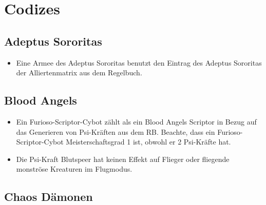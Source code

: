 \section{Codizes}

\subsection{Adeptus Sororitas}

\begin{itemize}

 \item Eine Armee des Adeptus Sororitas benutzt den Eintrag des Adeptus
  Sororitas der Alliertenmatrix aus dem Regelbuch.

\end{itemize}

\subsection{Blood Angels}

\begin{itemize}

 \item Ein Furioso-Scriptor-Cybot zählt als ein Blood Angels Scriptor in Bezug
  auf das Generieren von Psi-Kräften aus dem RB. Beachte, dass ein
  Furioso-Scriptor-Cybot Meisterschaftsgrad 1 ist, obwohl er 2 Psi-Kräfte hat.

 \item Die Psi-Kraft Blutspeer hat keinen Effekt auf Flieger oder fliegende
  monströse Kreaturen im Flugmodus.

\end{itemize}

\subsection{Chaos Dämonen}

